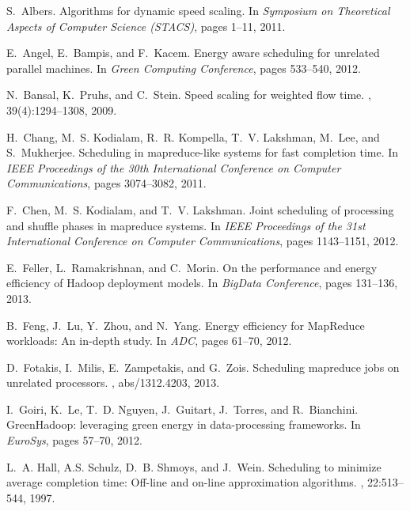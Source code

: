 \documentclass{llncs}
\begin{document}

\begin{thebibliography}{10}

S.~Albers.
\newblock Algorithms for dynamic speed scaling.
\newblock In {\em Symposium on Theoretical Aspects of Computer Science
  (STACS)}, pages 1--11, 2011.

E.~Angel, E.~Bampis, and F.~Kacem.
\newblock Energy aware scheduling for unrelated parallel machines.
\newblock In {\em Green Computing Conference}, pages 533--540, 2012.

N.~Bansal, K.~Pruhs, and C.~Stein.
\newblock Speed scaling for weighted flow time.
, 39(4):1294--1308, 2009.

H.~Chang, M.~S. Kodialam, R.~R. Kompella, T.~V. Lakshman, M.~Lee, and
  S.~Mukherjee.
\newblock Scheduling in mapreduce-like systems for fast completion time.
\newblock In {\em {IEEE} Proceedings of the 30th International Conference on
  Computer Communications}, pages 3074--3082, 2011.

F.~Chen, M.~S. Kodialam, and T.~V. Lakshman.
\newblock Joint scheduling of processing and shuffle phases in mapreduce
  systems.
\newblock In {\em {IEEE} Proceedings of the 31st International Conference on
  Computer Communications}, pages 1143--1151, 2012.

E.~Feller, L.~Ramakrishnan, and C.~Morin.
\newblock On the performance and energy efficiency of {H}adoop deployment
  models.
\newblock In {\em BigData Conference}, pages 131--136, 2013.

B.~Feng, J.~Lu, Y.~Zhou, and N.~Yang.
\newblock Energy efficiency for {M}ap{R}educe workloads: {A}n in-depth study.
\newblock In {\em ADC}, pages 61--70, 2012.

D.~Fotakis, I.~Milis, E.~Zampetakis, and G.~Zois.
\newblock Scheduling mapreduce jobs on unrelated processors.
, abs/1312.4203, 2013.

I.~Goiri, K.~Le, T.~D. Nguyen, J.~Guitart, J.~Torres, and R.~Bianchini.
\newblock Green{H}adoop: leveraging green energy in data-processing frameworks.
\newblock In {\em EuroSys}, pages 57--70, 2012.

L.~A. Hall, A.S. Schulz, D.~B. Shmoys, and J.~Wein.
\newblock Scheduling to minimize average completion time: Off-line and on-line
  approximation algorithms.
, 22:513--544, 1997.


\end{thebibliography}
\end{document}

